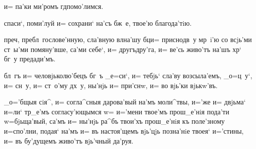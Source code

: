   и= па'ки ми'ромъ гд помо'лимся.


 спаси`, поми'луй и= сохрани` на'съ бж~е, 
твое'ю благода'тiю.


 преч, пребл~гослове'нную, сла'вную 
вл на'шу бц и= приснодв~у мр~i'ю со всjь'ми 
ст~ы'ми помяну'вше, са'ми себе`, и= другъдру'га, и= ве'сь 
живо'тъ на'шъ хр` бг~у предади'мъ.



 бл~гъ и= человjьколю'бецъ бг~ъ _е=си`, и= 
тебjь` сла'ву возсыла'емъ, _о=ц~у`, и= сн~у, и= ст~о'му 
дх~у, ны'нjь и= при'снw, и= во вjь'ки вjькw'въ.



 _о='бщыя сiя^, и= согла^сныя дарова'вый на'мъ 
моли^твы, и='же и= двjьма` и=ли` тр_е'мъ согласу'ющымся 
w= и='мени твое'мъ прош_е'нiя пода'ти w=бjьща'вый, са'мъ 
и= ны'нjь ра^бъ твои'хъ прош_е'нiя къ поле'зному 
и=спо'лни, подая` на'мъ и= въ настоя'щемъ вjь'цjь 
позна'нiе твоея` и='стины, и= въ бу'дущемъ живо'тъ 
вjь'чный да'руя.

